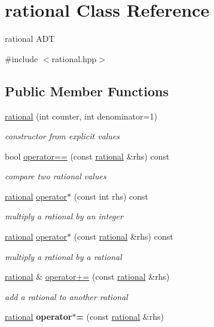 \hypertarget{classrational}{}\section{rational Class Reference}
\label{classrational}


rational A\+DT  




{\ttfamily \#include $<$rational.\+hpp$>$}

\subsection*{Public Member Functions}
\begin{DoxyCompactItemize}
\item 
\hyperlink{classrational_a5f971ef33181044f54d8e4fee71cb957}{rational} (int counter, int denominator=1)
\begin{DoxyCompactList}\small\item\em constructor from explicit values \end{DoxyCompactList}\item 
bool \hyperlink{classrational_a5f9a93cc7fd6309f5eae4c76d81f28d5}{operator==} (const \hyperlink{classrational}{rational} \&rhs) const 
\begin{DoxyCompactList}\small\item\em compare two rational values \end{DoxyCompactList}\item 
\hyperlink{classrational}{rational} \hyperlink{classrational_acbaf4f76b2caf4aafb850202e29d69ce}{operator$\ast$} (const int rhs) const 
\begin{DoxyCompactList}\small\item\em multiply a rational by an integer \end{DoxyCompactList}\item 
\hyperlink{classrational}{rational} \hyperlink{classrational_a13f267e5cdafffcc44203762548bb5cd}{operator$\ast$} (const \hyperlink{classrational}{rational} \&rhs) const 
\begin{DoxyCompactList}\small\item\em multiply a rational by a rational \end{DoxyCompactList}\item 
\hyperlink{classrational}{rational} \& \hyperlink{classrational_a9b83ad0c803d2ac242b42e71d954a356}{operator+=} (const \hyperlink{classrational}{rational} \&rhs)
\begin{DoxyCompactList}\small\item\em add a rational to another rational \end{DoxyCompactList}\item 
\hyperlink{classrational}{rational} {\bfseries operator$\ast$=} (const \hyperlink{classrational}{rational} \&rhs)\hypertarget{classrational_a2b5729aef261d16cd18ff7c7fcbf8c6e}{}\label{classrational_a2b5729aef261d16cd18ff7c7fcbf8c6e}

\end{DoxyCompactItemize}
